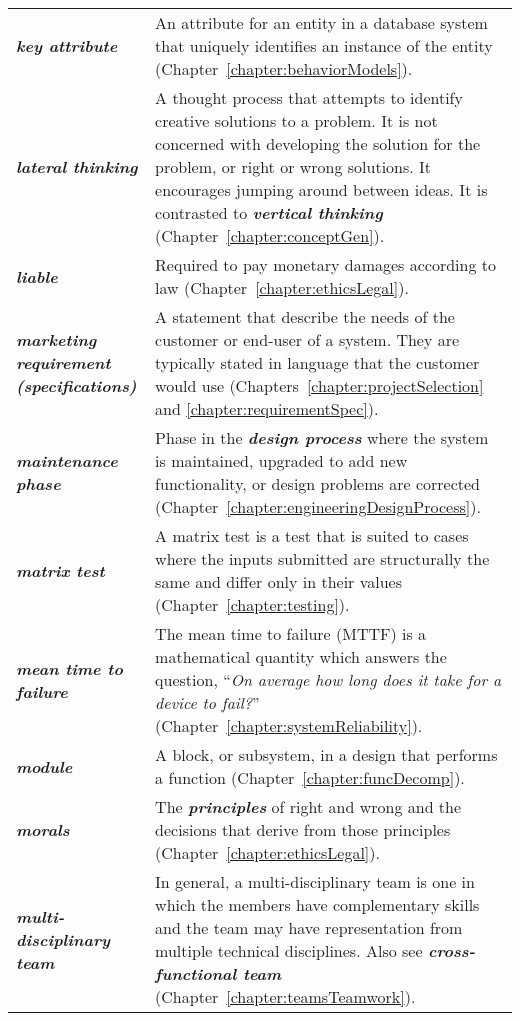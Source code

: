 \begin{longtable} { p{3cm} p{11cm}}
\emph{\textbf{key attribute}} & An attribute for an entity in a database
system that uniquely identifies an instance of the entity 
(Chapter~\ref{chapter:behaviorModels}). \B \\
\emph{\textbf{lateral thinking}} & A thought process that attempts to
identify creative solutions to a problem. It is not concerned with
developing the solution for the problem, or right or wrong solutions. It
encourages jumping around be­tween ideas. It is contrasted to
\emph{\textbf{vertical thinking}} (Chapter~\ref{chapter:conceptGen}). \B \\
\emph{\textbf{liable}} & Required to pay monetary damages according to
law (Chapter~\ref{chapter:ethicsLegal}). \B \\
\emph{\textbf{marketing requirement (specifications)}} & A statement
that describe the needs of the customer or end-user of a system. They
are typically stated in language that the customer would use (Chapters~\ref{chapter:projectSelection}
and \ref{chapter:requirementSpec}). \B \\
\emph{\textbf{maintenance phase}} & Phase in the \emph{\textbf{design
process}} where the system is maintained, upgraded to add new
functionality, or design problems are corrected (Chapter~\ref{chapter:engineeringDesignProcess}). \B \\
\emph{\textbf{matrix test}} & A matrix test is a test that is suited to
cases where the inputs submitted are structurally the same and differ
only in their values (Chapter~\ref{chapter:testing}). \B \\
\emph{\textbf{mean time to failure}} & The mean time to failure (MTTF)
is a mathematical quantity which answers the question, ``\emph{On
average how long does it take for a device to fail?}'' (Chapter~\ref{chapter:systemReliability}). \B \\
\emph{\textbf{module}} & A block, or subsystem, in a design that
performs a function (Chapter~\ref{chapter:funcDecomp}). \B \\
\emph{\textbf{morals}} & The \emph{\textbf{principles}} of right and
wrong and the decisions that derive from those principles 
(Chapter~\ref{chapter:ethicsLegal}). \B \\
\emph{\textbf{multi-disciplinary team}} & In general, a
multi-disciplinary team is one in which the members have complementary
skills and the team may have representation from multiple technical
disciplines. Also see \emph{\textbf{cross-functional team}} 
(Chapter~\ref{chapter:teamsTeamwork}). \B \\

\end{longtable}
